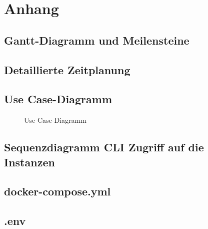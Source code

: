 \section{Anhang}
\label{sec:Anhang}
\subsection{Gantt-Diagramm und Meilensteine}
\label{app:Gantt}
\clearpage

\subsection{Detaillierte Zeitplanung}
\label{app:Zeitplanung}
\clearpage

\subsection{Use Case-Diagramm}
\label{app:UseCase}
\begin{figure}[htb]
\centering
{}
\caption{Use Case-Diagramm}
\end{figure}
\clearpage

\subsection{Sequenzdiagramm CLI Zugriff auf die Instanzen}
\label{app:Sequenzdiagramm CLI Zugriff auf die Instanzen}
\clearpage


\subsection{docker-compose.yml}
\label{app:docker-compose.yml}

\subsection{.env}
\label{app:dotenv}

